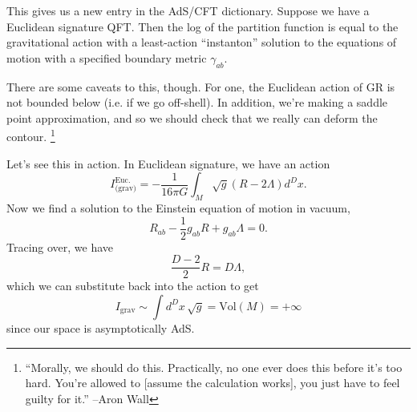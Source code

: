 This gives us a new entry in the AdS/CFT dictionary. Suppose we have a Euclidean signature QFT. Then the log of the partition function is equal to the gravitational action with a least-action ``instanton'' solution to the equations of motion with a specified boundary metric $\gamma_{ab}$.

There are some caveats to this, though. For one, the Euclidean action of GR is not bounded below (i.e. if we go off-shell). In addition, we're making a saddle point approximation, and so we should check that we really can deform the contour.%
    \footnote{``Morally, we should do this. Practically, no one ever does this before it's too hard. You're allowed to [assume the calculation works], you just have to feel guilty for it.'' --Aron Wall}
    
Let's see this in action. In Euclidean signature, we have an action
\begin{equation}
    I_\text{(grav)}^\text{Euc.}=-\frac{1}{16\pi G} \int_M \sqrt{g}(R-2\Lambda) d^Dx.
\end{equation}
Now we find a solution to the Einstein equation of motion in vacuum,
\begin{equation}
    R_{ab}-\frac{1}{2} g_{ab} R + g_{ab} \Lambda = 0.
\end{equation}
Tracing over, we have
\begin{equation}
    \frac{D-2}{2}R = D\Lambda,
\end{equation}
which we can substitute back into the action to get
\begin{equation}
    I_\text{grav} \sim \int d^Dx \, \sqrt{g} = \text{Vol}(M)=+\infty
\end{equation}
since our space is asymptotically AdS.

